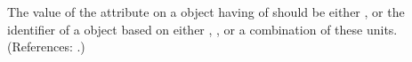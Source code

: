 The value of the attribute  on a \Compartment object having
 of  should be either 
, or the identifier of a \UnitDefinition object based on either
,  , or a combination of these units.  (References: .)
